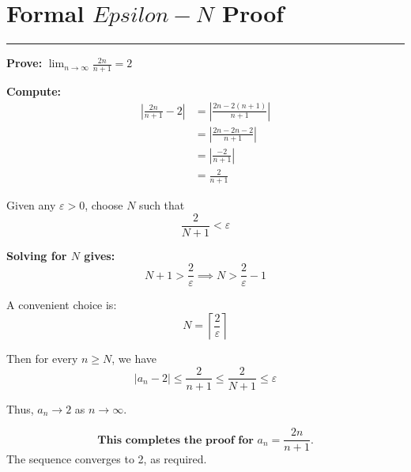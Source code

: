 \documentclass{article}
\begin{document}
\section*{Formal $Epsilon-N$ Proof}
\hrule
\bigskip

\textbf{Prove:} $\displaystyle \lim_{n\to\infty} \frac{2n}{n + 1} = 2$

\bigskip

\textbf{Compute:}
\begin{align*}
\left|\frac{2n}{n + 1} - 2\right|
&= \left|\frac{2n - 2(n + 1)}{n + 1}\right| \\
&= \left|\frac{2n - 2n - 2}{n + 1}\right| \\
&= \left|\frac{-2}{n + 1}\right| \\
&= \frac{2}{n + 1}
\end{align*}

Given any $\varepsilon > 0$, choose $N$ such that
\[
\frac{2}{N + 1} < \varepsilon
\]

\textbf{Solving for $N$ gives:}
\[
N + 1 > \frac{2}{\varepsilon} \implies N > \frac{2}{\varepsilon} - 1
\]

A convenient choice is:
\[
N = \left\lceil \frac{2}{\varepsilon} \right\rceil
\]

Then for every $n \ge N$, we have
\[
|a_n - 2| \le \frac{2}{n + 1} \le \frac{2}{N + 1} \le \varepsilon
\]

Thus, $a_n \to 2$ as $n \to \infty$.

\bigskip

\[
\boxed{\textbf{This completes the proof for $a_n = \dfrac{2n}{n+1}$.}}
\]
The sequence converges to 2, as required.
\end{document}
